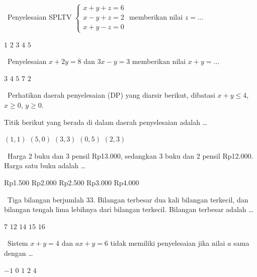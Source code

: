 \documentclass[11pt,a4paper]{exam}
\newcommand{\Inter}{{\footnotesize\textsf{\textcolor{biru}{[Intermediate]}}}\ }
\newcommand{\Adv}{{\footnotesize\textsf{\textcolor{oranye}{[Advanced]}}}\ }
\newcommand{\Exp}{{\footnotesize\textsf{\textcolor{ungu}{[Expert]}}}\ }
\begin{document}
\begin{questions}
\question \Inter Penyelesaian SPLTV $\begin{cases} x+y+z=6\\ x-y+z=2\\ x+y-z=0 \end{cases}$
memberikan nilai $z = \dots$
\begin{choices}
\choice $1$ \choice $2$ \CorrectChoice $3$ \choice $4$ \choice $5$
\end{choices}

\question \Inter Penyelesaian $x + 2y = 8$ dan $3x - y = 3$ memberikan nilai $x + y = \dots$
\begin{choices}
\choice $3$ \choice $4$ \CorrectChoice $5$ \choice $7$ \choice $2$
\end{choices}

\question \Inter Perhatikan daerah penyelesaian (DP) yang diarsir berikut, dibatasi
$x+y\le 4$, $x\ge 0$, $y\ge 0$.

\begin{center}
\end{center}

Titik berikut yang berada di dalam daerah penyelesaian adalah \dots
\begin{choices}
\CorrectChoice $(1,1)$ \choice $(5,0)$ \choice $(3,3)$ \choice $(0,5)$ \choice $(2,3)$
\end{choices}

\question \Adv Harga 2 buku dan 3 pensil Rp13.000, sedangkan 3 buku dan 2 pensil
Rp12.000. Harga satu buku adalah \dots
\begin{choices}
\choice Rp1.500 \CorrectChoice Rp2.000 \choice Rp2.500 \choice Rp3.000 \choice Rp4.000
\end{choices}

\question \Adv Tiga bilangan berjumlah 33. Bilangan terbesar dua kali bilangan
terkecil, dan bilangan tengah lima lebihnya dari bilangan terkecil. Bilangan
terbesar adalah \dots
\begin{choices}
\choice $7$ \choice $12$ \CorrectChoice $14$ \choice $15$ \choice $16$
\end{choices}

\question \Exp Sistem $x + y = 4$ dan $ax + y = 6$ tidak memiliki penyelesaian jika
nilai $a$ sama dengan \dots
\begin{choices}
\choice $-1$ \choice $0$ \CorrectChoice $1$ \choice $2$ \choice $4$
\end{choices}


\end{questions}
\end{document}
